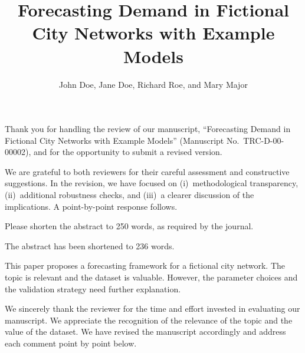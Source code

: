 \documentclass[11pt,english]{authorresponseletter}
\title{Forecasting Demand in Fictional City Networks with Example Models}
\author{John Doe, Jane Doe, Richard Roe, and Mary Major}
\begin{document}
\maketitle

\begin{coverletter}
Thank you for handling the review of our manuscript, \enquote{Forecasting Demand in Fictional City Networks with Example Models} (Manuscript No.~TRC-D-00-00002), and for the opportunity to submit a revised version.

We are grateful to both reviewers for their careful assessment and constructive suggestions. In the revision, we have focused on (i)~methodological transparency, (ii)~additional robustness checks, and (iii)~a clearer discussion of the implications. A point-by-point response follows.
\end{coverletter}

\printoverview

\editor

\begin{revcomment}
\label{e:c1}
Please shorten the abstract to 250 words, as required by the journal.
\end{revcomment}
\begin{revresponse}
The abstract has been shortened to 236 words.
\end{revresponse}

\reviewer

\begin{generalcomment}
This paper proposes a forecasting framework for a fictional city network. The topic is relevant and the dataset is valuable. However, the parameter choices and the validation strategy need further explanation.
\end{generalcomment}

\begin{generalresponse}[]
We sincerely thank the reviewer for the time and effort invested in evaluating our manuscript. We appreciate the recognition of the relevance of the topic and the value of the dataset. We have revised the manuscript accordingly and address each comment point by point below.
\end{generalresponse}
\end{document}
